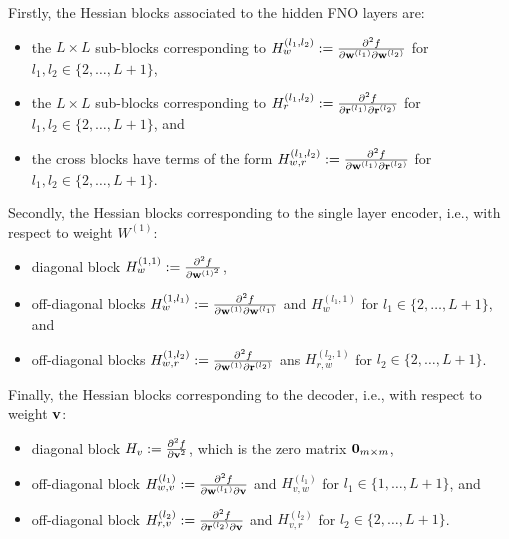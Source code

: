 Firstly, the Hessian blocks associated to the hidden FNO layers are: 
\begin{itemize}
\item the %
$L \times L$ sub-blocks corresponding to $H_{w}^{(l_1,l_2)} := \frac{\partial^2 f}{\partial \mathbf{w}^{(l_1)} \partial \mathbf{w}^{(l_2)}}$ for $l_1, l_2 \in \{2,\ldots,L+1\}$, 
\item the %
$L \times L$ sub-blocks corresponding to $H_{r}^{(l_1,l_2)} := \frac{\partial^2 f}{\partial \mathbf{r}^{(l_1)} \partial \mathbf{r}^{(l_2)}}$ for $l_1, l_2 \in \{2,\ldots,L+1\}$, and 
\item the 
cross blocks have terms of the form $H_{w,r}^{(l_1,l_2)} := \frac{\partial^2 f}{\partial \mathbf{w}^{(l_1)} \partial \mathbf{r}^{(l_2)}}$ for $l_1, l_2 \in \{2,\ldots,L+1\}$. 
\end{itemize}
%

Secondly, the Hessian blocks corresponding to the single layer encoder, i.e., with respect to weight $W^{(1)}$:
\begin{itemize}
\item diagonal block $H_{w}^{(1,1)} := \frac{\partial^2 f}{\partial \mathbf{w}^{{(1)}^2}}$,
\item off-diagonal blocks $H_{w}^{(1,l_1)} := \frac{\partial^2 f}{\partial \mathbf{w}^{(1)} \partial \mathbf{w}^{(l_1)}}$ and $H_{w}^{(l_1,1)}$ for $l_1 \in \{2,\ldots,L+1\}$, and 
\item off-diagonal blocks $H_{w,r}^{(1,l_2)} := \frac{\partial^2 f}{\partial \mathbf{w}^{(1)} \partial \mathbf{r}^{(l_2)}}$ ans $H_{r,w}^{(l_2,1)}$ for $l_2 \in \{2,\ldots,L+1\}$.
\end{itemize}

Finally, the Hessian blocks corresponding to the decoder, i.e., with respect to weight $\mathbf{v}$:
\begin{itemize}
\item diagonal block $H_{v} := \frac{\partial^2 f}{\partial \mathbf{v}^2}$, which is the zero matrix ${\bm{0}}_{m\times m}$,
\item off-diagonal block $H_{w,v}^{(l_1)} := \frac{\partial^2 f}{\partial \mathbf{w}^{(l_1)} \partial \mathbf{v}}$ and $H_{v,w}^{(l_1)}$ for $l_1 \in \{1,\ldots,L+1\}$, and
\item off-diagonal block $H_{r,v}^{(l_2)} := \frac{\partial^2 f}{\partial \mathbf{r}^{(l_2)} \partial \mathbf{v}}$ and $H_{v,r}^{(l_2)}$ for $l_2 \in \{2,\ldots,L+1\}$.
\end{itemize}


